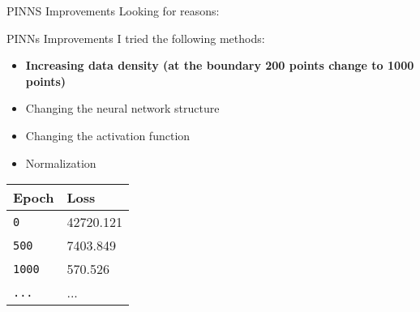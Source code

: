 \documentclass{beamer}
\begin{document}
\begin{frame}{PINNS Improvements}
Looking for reasons:

    \vspace{1em}
\end{frame}

\begin{frame}{PINNs Improvements}
I tried the following methods: 
\begin{itemize}
    \item \textbf{Increasing data density (at the boundary 200 points change to 1000 points)}
    \item Changing the neural network structure
    \item Changing the activation function
    \item Normalization
\end{itemize}
\begin{table}[!htbp]
    \centering
    \begin{tabular}{l  | l}
    \hline
        Epoch & Loss \\
        \hline
        \texttt{0}  & 42720.121 \\
        \texttt{500} & 7403.849  \\
        \texttt{1000}  & 570.526 \\
        \texttt{...}& ... \\
        \hline
    \end{tabular}
    \label{doc}
\end{table}
\end{frame}
\end{document}
